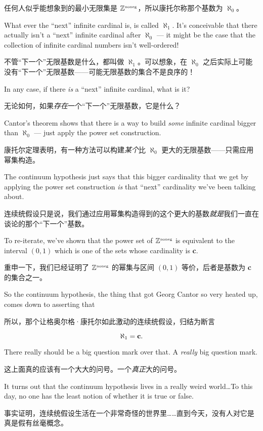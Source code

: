 任何人似乎能想象到的最小无限集是 ${\mathbb Z}^{\mbox{\tiny noneg}}$，所以康托尔称那个基数为 $\aleph_0$。

What ever the ``next'' infinite cardinal is, is
called $\aleph_1$.  It's conceivable that there actually isn't a ``next'' infinite cardinal after $\aleph_0$ --- it might be the case that the collection of
infinite cardinal numbers isn't well-ordered!

不管“下一个”无限基数是什么，都叫做 $\aleph_1$。可以想象，在 $\aleph_0$ 之后实际上可能没有“下一个”无限基数——可能无限基数的集合不是良序的！

In any case, if there \emph{is} a
``next'' infinite cardinal, what is it?

无论如何，如果\emph{存在}一个“下一个”无限基数，它是什么？

Cantor's theorem shows that there is
a way to build \emph{some} infinite cardinal bigger than $\aleph_0$ --- just
apply the power set construction.

康托尔定理表明，有一种方法可以构建\emph{某个}比 $\aleph_0$ 更大的无限基数——只需应用幂集构造。

The continuum hypothesis just says that this
bigger cardinality that we get by applying the power set construction \emph{is} that ``next'' cardinality we've been talking about.

连续统假设只是说，我们通过应用幂集构造得到的这个更大的基数\emph{就是}我们一直在谈论的那个“下一个”基数。

To re-iterate, we've shown that the power set of ${\mathbb Z}^{\mbox{\tiny noneg}}$ is equivalent
to the interval $(0,1)$ which is one of the sets whose cardinality is {\bf c}.

重申一下，我们已经证明了 ${\mathbb Z}^{\mbox{\tiny noneg}}$ 的幂集与区间 $(0,1)$ 等价，后者是基数为 {\bf c} 的集合之一。

So the continuum hypothesis, the thing that got Georg Cantor so very heated up,
comes down to asserting that

所以，那个让格奥尔格·康托尔如此激动的连续统假设，归结为断言

\[ \aleph_1 = \mbox{{\bf c}}.
\]

There really should be a big question mark over that.  A \emph{really} big
question mark.

这上面真的应该有一个大大的问号。一个\emph{真正}大的问号。

It turns out that the continuum hypothesis lives in a really
weird world\ldots   To this day, no one has the least notion of whether it
is true or false.

事实证明，连续统假设生活在一个非常奇怪的世界里……直到今天，没有人对它是真是假有丝毫概念。

